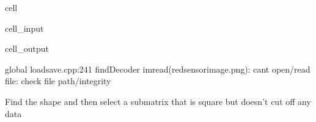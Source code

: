 \documentclass[letterpaper,10pt,english]{jupyterBook}
\begin{document}
\begin{sphinxuseclass}{cell}\begin{sphinxVerbatimInput}

\begin{sphinxuseclass}{cell_input}
\begin{sphinxVerbatim}[commandchars=\\\{\}]
   
\end{sphinxVerbatim}

\end{sphinxuseclass}\end{sphinxVerbatimInput}
\begin{sphinxVerbatimOutput}

\begin{sphinxuseclass}{cell_output}
\begin{sphinxVerbatim}[commandchars=\\\{\}]
[ WARN:0@0.024] global loadsave.cpp:241 findDecoder imread\PYGZus{}(\PYGZsq{}red\PYGZus{}sensor\PYGZus{}image.png\PYGZsq{}): can\PYGZsq{}t open/read file: check file path/integrity
\end{sphinxVerbatim}

\end{sphinxuseclass}\end{sphinxVerbatimOutput}

\end{sphinxuseclass}
\sphinxAtStartPar
Find the shape and then select a submatrix that is square but doesn’t cut off any data
\end{document}
